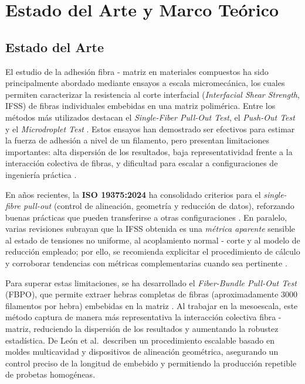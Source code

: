 
\section{Estado del Arte y Marco Teórico}

\subsection{Estado del Arte}
    
El estudio de la adhesión fibra - matriz en materiales compuestos ha sido principalmente abordado
mediante ensayos a escala micromecánica, los cuales permiten caracterizar la resistencia
al corte interfacial (\textit{Interfacial Shear Strength}, IFSS) de fibras individuales embebidas
en una matriz polimérica. Entre los métodos más utilizados destacan el \textit{Single-Fiber Pull-Out
Test}, el \textit{Push-Out Test} y el \textit{Microdroplet Test} \cite{Miller1987, Gao2015, Ouyang2020}.
Estos ensayos han demostrado ser efectivos para estimar la fuerza de adhesión a nivel de un
filamento, pero presentan limitaciones importantes: alta dispersión de los resultados, baja
representatividad frente a la interacción colectiva de fibras, y dificultad para escalar
a configuraciones de ingeniería práctica \cite{DINSPEC19289, Liu2021}.

En años recientes, la \textbf{ISO 19375:2024} ha consolidado criterios para el \textit
{single-fibre pull-out} (control de alineación, geometría y reducción de datos), reforzando buenas
prácticas que pueden transferirse a otras configuraciones \cite{ISO19375}. En paralelo, varias
revisiones subrayan que la IFSS obtenida es una \textit{métrica aparente} sensible al estado de
tensiones no uniforme, al acoplamiento normal - corte y al modelo de reducción empleado; por ello,
se recomienda explicitar el procedimiento de cálculo y corroborar tendencias con métricas
complementarias cuando sea pertinente \cite{Fischer2020, Liu2021, AhmadvashAghbash2024IMR}.

Para superar estas limitaciones, se ha desarrollado el \textit{Fiber-Bundle Pull-Out Test}
(FBPO), que permite extraer hebras completas de fibras (aproximadamente 3000 filamentos por hebra)
embebidas en la matriz \cite{DeLeon2022}. Al trabajar en la mesoescala, este método captura
de manera más representativa la interacción colectiva fibra - matriz, reduciendo la dispersión de
los resultados y aumentando la robustez estadística. De León et al.\ describen un procedimiento
escalable basado en moldes multicavidad y dispositivos de alineación geométrica,
asegurando un control preciso de la longitud de embebido y permitiendo la producción repetible de
probetas homogéneas.

